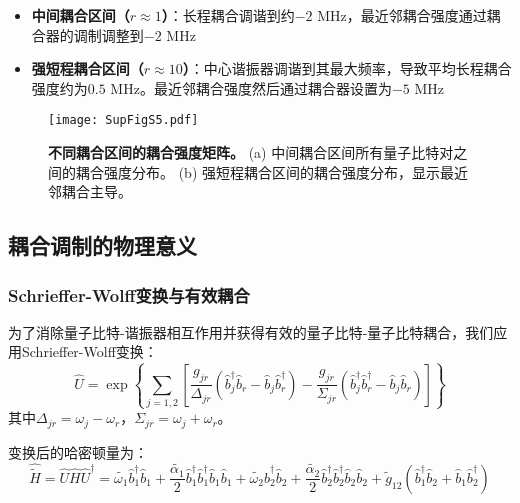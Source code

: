 \documentclass[11pt,a4paper]{article}
\begin{document}
\begin{itemize}
    \item \textbf{中间耦合区间（$r \approx 1$）}：长程耦合调谐到约$-2$ MHz，最近邻耦合强度通过耦合器的调制调整到$-2$ MHz
    \item \textbf{强短程耦合区间（$r \approx 10$）}：中心谐振器调谐到其最大频率，导致平均长程耦合强度约为$0.5$ MHz。最近邻耦合强度然后通过耦合器设置为$-5$ MHz
\end{itemize}

\begin{figure}[H]
    \centering
    \texttt{[image: SupFigS5.pdf]}
    \caption{
        \textbf{不同耦合区间的耦合强度矩阵。}
        (a) 中间耦合区间所有量子比特对之间的耦合强度分布。
        (b) 强短程耦合区间的耦合强度分布，显示最近邻耦合主导。
    }
    \label{fig:coupling_matrices}
\end{figure}

\subsection{耦合调制的物理意义}

\subsubsection{Schrieffer-Wolff变换与有效耦合}

为了消除量子比特-谐振器相互作用并获得有效的量子比特-量子比特耦合，我们应用Schrieffer-Wolff变换：
\[
\hat{U} = \exp\left\{\sum_{j=1,2}\left[\frac{g_{jr}}{\Delta_{jr}}(\hat{b}^{\dagger}_j\hat{b}_r - \hat{b}_j\hat{b}^{\dagger}_r) - \frac{g_{jr}}{\Sigma_{jr}}(\hat{b}^{\dagger}_j\hat{b}^{\dagger}_r - \hat{b}_j\hat{b}_r)\right]\right\}
\]
其中$\Delta_{jr} = \omega_j - \omega_r$，$\Sigma_{jr} = \omega_j + \omega_r$。

变换后的哈密顿量为：
\[
\hat{\tilde{H}} = \hat{U}\hat{H}\hat{U}^{\dagger} = \widetilde{\omega_1}\hat{b}^{\dagger}_1\hat{b}_1 + \frac{\widetilde{\alpha_1}}{2}\hat{b}^{\dagger}_1\hat{b}^{\dagger}_1\hat{b}_1\hat{b}_1 + \widetilde{\omega_2}\hat{b}^{\dagger}_2\hat{b}_2 + \frac{\widetilde{\alpha_2}}{2}\hat{b}^{\dagger}_2\hat{b}^{\dagger}_2\hat{b}_2\hat{b}_2 + \widetilde{g}_{12}(\hat{b}^{\dagger}_1\hat{b}_2 + \hat{b}_1\hat{b}^{\dagger}_2)
\]
\end{document}
